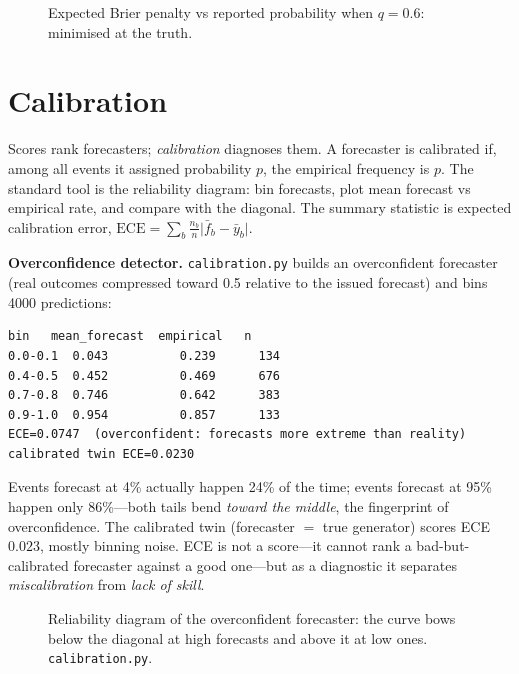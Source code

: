 \begin{figure}[htbp]\centering

\caption{Expected Brier penalty vs reported probability when $q=0.6$: minimised at the truth.}
\label{fig:score}
\end{figure}

\section{Calibration}\label{sec:calib}

Scores rank forecasters; \emph{calibration} diagnoses them. A forecaster is calibrated if,
among all events it assigned probability $p$, the empirical frequency is $p$. The standard
tool is the reliability diagram: bin forecasts, plot mean forecast vs empirical rate, and
compare with the diagonal. The summary statistic is expected calibration error,
$\mathrm{ECE}=\sum_b \frac{n_b}{n}\lvert \bar f_b - \bar y_b\rvert$.

\begin{example}\label{ex:calib}
\textbf{Overconfidence detector.} \texttt{calibration.py} builds an overconfident forecaster
(real outcomes compressed toward 0.5 relative to the issued forecast) and bins 4000
predictions:
\begin{lstlisting}[numbers=none]
bin   mean_forecast  empirical   n
0.0-0.1  0.043          0.239      134
0.4-0.5  0.452          0.469      676
0.7-0.8  0.746          0.642      383
0.9-1.0  0.954          0.857      133
ECE=0.0747  (overconfident: forecasts more extreme than reality)
calibrated twin ECE=0.0230
\end{lstlisting}
\begin{solution}
Events forecast at 4\% actually happen 24\% of the time; events forecast at 95\% happen only
86\%---both tails bend \emph{toward the middle}, the fingerprint of overconfidence. The
calibrated twin (forecaster $=$ true generator) scores ECE $0.023$, mostly binning noise.
ECE is not a score---it cannot rank a bad-but-calibrated forecaster against a good one---but
as a diagnostic it separates \emph{miscalibration} from \emph{lack of skill}.
\end{solution}
\end{example}

\begin{figure}[htbp]\centering

\caption{Reliability diagram of the overconfident forecaster: the curve bows below the
diagonal at high forecasts and above it at low ones. \texttt{calibration.py}.}
\label{fig:reliability}
\end{figure}

